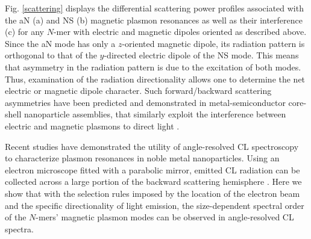 \documentclass [11pt, proquest] {uwthesis}[2016/11/22]
\begin{document}
Fig. \ref{scattering} displays the differential scattering power profiles associated with the aN (a) and NS (b) magnetic plasmon resonances as well as their interference (c) for any $N$-mer with electric and magnetic dipoles oriented as described above. Since the aN mode has only a $z$-oriented magnetic dipole, its radiation pattern is orthogonal to that of the $y$-directed electric dipole of the NS mode. This means that asymmetry in the radiation pattern is due to the excitation of both modes. Thus, examination of the radiation directionality allows one to determine the net electric or magnetic dipole character. Such forward/backward scattering asymmetries have been predicted and demonstrated in metal-semiconductor core-shell nanoparticle assemblies, that similarly exploit the interference between electric and magnetic plasmons to direct light \cite{Kivshar2012}.


Recent studies have demonstrated the utility of angle-resolved CL spectroscopy to characterize plasmon resonances in noble metal nanoparticles\cite{Coenen2011,CoPol2011,Polman2014}. Using an electron microscope fitted with a parabolic mirror, emitted CL radiation can be collected across a large portion of the backward scattering hemisphere \cite{Coenen2011,CoPol2011,Polman2014}. Here we show that with the selection rules imposed by the location of the electron beam and the specific directionality of light emission, the size-dependent spectral order of the $N$-mers' magnetic plasmon modes can be observed in angle-resolved CL spectra. 


\end{document}
